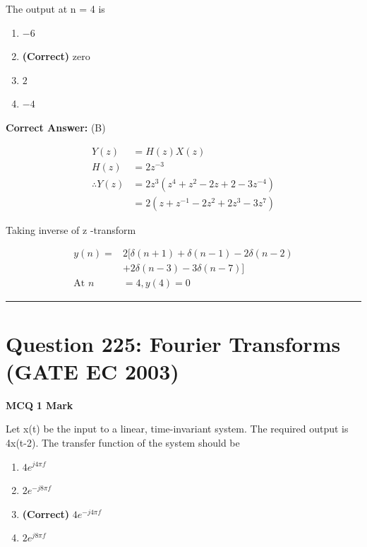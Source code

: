 \documentclass[11pt,a4paper]{article}
\begin{document}
The output at n = 4 is


\begin{enumerate}[label=(\Alph*)]
    \item $-6$
    \item \textbf{(Correct)} zero
    \item $2$
    \item $-4$
\end{enumerate}

\noindent \textbf{Correct Answer:} (B)

\begin{tcolorbox}[solbox, title=Detailed Solution -- Question 224]
\[
\begin{aligned} Y(z) &=H(z) X(z) \\ H(z) &=2 z^{-3} \\ \therefore Y(z) &=2 z^{3}\left(z^{4}+z^{2}-2 z+2-3 z^{-4}\right) \\ &=2\left(z+z^{-1}-2 z^{2}+2 z^{3}-3 z^{7}\right) \end{aligned}
\]

 Taking inverse of z -transform

\[
\begin{aligned} y(n)=& 2[\delta(n+1)+\delta(n-1)-2 \delta(n-2)\\ &+2 \delta(n-3)-3 \delta(n-7)]\\ \text{At }n&=4, y(4)=0 \end{aligned}
\]
\end{tcolorbox}

\vspace{1.5em}
\hrule
\vspace{1.5em}

\section*{Question 225: Fourier Transforms (GATE EC 2003)}
\noindent \textbf{\color{primary}MCQ} \hfill \textbf{\color{secondary}1 Mark}


\noindent Let x(t) be the input to a linear, time-invariant system. The required output is 4x(t-2). The transfer function of the system should be


\begin{enumerate}[label=(\Alph*)]
    \item $4e^{j4\pi f}$
    \item $2e^{-j8\pi f}$
    \item \textbf{(Correct)} $4e^{-j4\pi f}$
    \item $2e^{j8\pi f}$
\end{enumerate}
\end{document}
